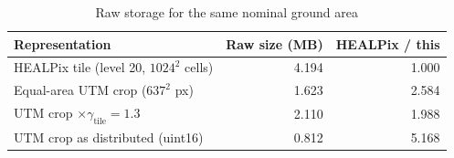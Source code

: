\begin{table}[t]
\centering
\caption{Raw storage for the same nominal ground area}
\label{tab:storage_accounting}
\footnotesize
\setlength{\tabcolsep}{3pt}
\begin{tabular}{lrr}
\toprule
Representation & Raw size (MB) & HEALPix / this \\
\midrule
HEALPix tile (level 20, $1024^2$ cells) & 4.194 & 1.000 \\
Equal-area UTM crop ($637^2$ px) & 1.623 & 2.584 \\
UTM crop $\times\gamma_{\mathrm{tile}}=1.3$ & 2.110 & 1.988 \\
UTM crop as distributed (uint16) & 0.812 & 5.168 \\
\bottomrule
\end{tabular}
\end{table}
